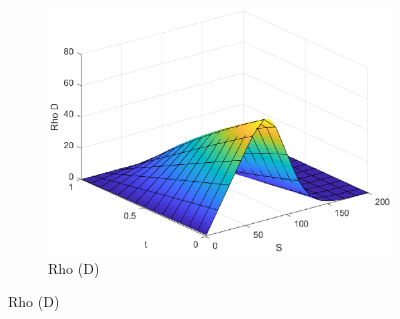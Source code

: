 \begin{figure}[H]
\begin{subfigure}[b]{0.35\linewidth}
        \includegraphics[width=\linewidth]{Imagenes/Parte1/6_Sols/Put/Put_Rho_D.eps}
        \caption{Rho (D)}
    \end{subfigure}
\end{figure}



